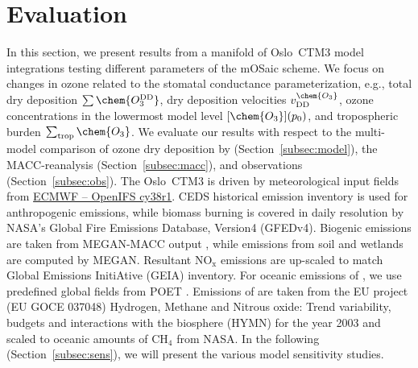 \documentclass[gmd, manuscript]{copernicus}
\begin{document}
\section{Evaluation}
\label{sec:eval}
In this section, we present results from a manifold of Oslo~CTM3 model integrations testing different parameters of the mOSaic scheme. We focus on changes in ozone related to the stomatal conductance parameterization, e.g., total dry deposition $\sum\chem{O_3^\text{DD}}$, dry deposition velocities $v^\chem{O_3}_\text{DD}$, ozone concentrations in the lowermost model level $[\chem{O_3}](p_0)$, and tropospheric burden $\sum_\text{trop}\chem{O_3}$. We evaluate our results with respect to the multi-model comparison of ozone dry deposition by \citet{ACP:Hardacre2015} (Section~\ref{subsec:model}), the MACC-reanalysis (Section~\ref{subsec:macc}), and observations (Section~\ref{subsec:obs}). The Oslo~CTM3 is driven by meteorological input fields from \href{https://www.ecmwf.int/en/forecasts/documentation-and-support/evolution-ifs/cycle-38r1-summary-changes}{ECMWF -- OpenIFS cy38r1}. CEDS historical emission inventory is used for anthropogenic emissions, while biomass burning is covered in daily resolution by NASA's Global Fire Emissions Database, Version4 (GFEDv4). Biogenic emissions are taken from MEGAN-MACC output \citep{ACP:Sindelarova2014}, while emissions from soil and wetlands are computed by MEGAN. Resultant $\mathrm{NO_x}$ emissions are up-scaled to match Global Emissions InitiAtive (GEIA) inventory. For oceanic emissions of , we use predefined global fields from POET \citep{POET}. Emissions of  are taken from the EU project (EU GOCE 037048) Hydrogen, Methane and Nitrous oxide: Trend variability, budgets and interactions with the biosphere (HYMN) for the year 2003 and scaled to oceanic amounts of $\mathrm{CH_4}$ from NASA. In the following (Section~\ref{subsec:sens}), we will present the various model sensitivity studies.
\end{document}
